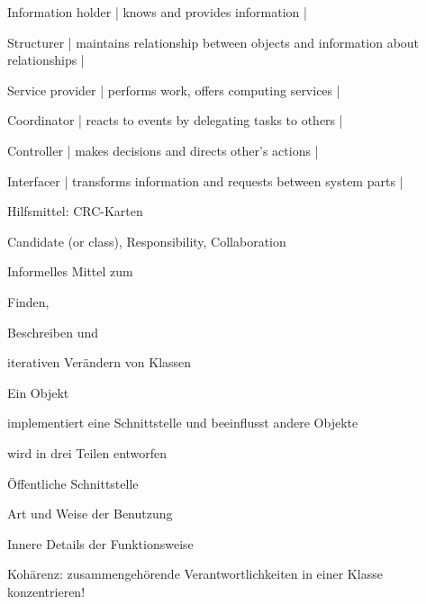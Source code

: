\documentclass[a4paper]{article}
\begin{document}
\begin{multicols}{3}
  \begin{itemize*}
    \item Information holder  | knows and provides information |
    \item Structurer | maintains relationship between objects and information about relationships |
    \item Service provider | performs work, offers computing services |
    \item Coordinator | reacts to events by delegating tasks to others |
    \item Controller | makes decisions and directs other’s actions |
    \item Interfacer | transforms information and requests between system parts |
  \end{itemize*}

  Hilfsmittel: CRC-Karten
  \begin{itemize*}
    \item Candidate (or class), Responsibility, Collaboration
    \item Informelles Mittel zum
          \begin{itemize*}
            \item Finden,
            \item Beschreiben und
            \item iterativen Verändern von Klassen
          \end{itemize*}
  \end{itemize*}

  Ein Objekt
  \begin{itemize*}
    \item implementiert eine Schnittstelle und beeinflusst andere Objekte
    \item wird in drei Teilen entworfen
          \begin{itemize*}
            \item Öffentliche Schnittstelle
            \item Art und Weise der Benutzung
            \item Innere Details der Funktionsweise
          \end{itemize*}
    \item Kohärenz: zusammengehörende Verantwortlichkeiten in einer Klasse konzentrieren!
  \end{itemize*}



\end{multicols}
\end{document}
